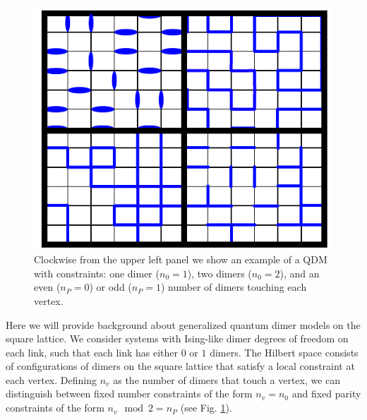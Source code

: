 \documentclass[twocolumn,prb,aps,floatfix,superscriptaddress]{revtex4-1}
\newcommand{\figref}[1]{Fig. \ref{#1}}
\begin{document}
\begin{figure}[htpb]
    \centering
    \includegraphics[width=0.8\linewidth]{example_local_constraints.pdf}
    \caption{Clockwise from the upper left panel we show an example of a QDM with constraints: one
    dimer ($n_0 = 1$), two dimers ($n_0 = 2$), and an even ($n_P = 0$) or odd ($n_P = 1$) number of dimers touching each vertex.}
    \label{fig:example_local_constraints}
\end{figure}
Here we will provide background about generalized quantum dimer models on the square lattice. We consider systems with Ising-like dimer degrees of freedom on each link, such that each link has either $0$ or $1$ dimers. The Hilbert space consists of configurations of dimers on the square lattice that satisfy a local constraint at each vertex. Defining $n_v$ as the number of dimers that touch a vertex, we can distinguish between fixed number constraints of the form $n_v = n_0$ and fixed parity constraints of the form $n_v\mod 2 = n_P$ (see \figref{fig:example_local_constraints}).
\end{document}
